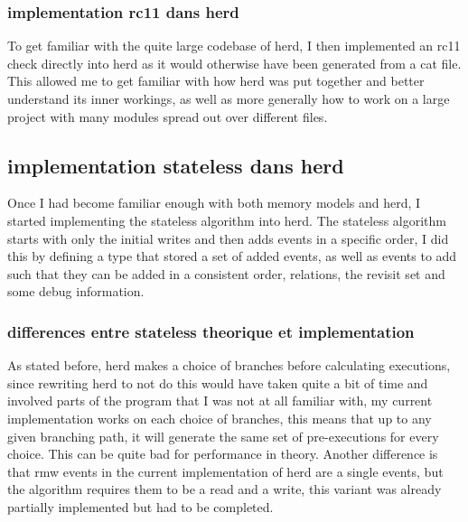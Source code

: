 \documentclass[a4,12pt]{article}
\begin{document}
\subsubsection{implementation rc11 dans herd}

To get familiar with the quite large codebase of herd, I then implemented an rc11 check directly into herd as it would otherwise have been generated from a cat file. This allowed me to get familiar with how herd was put together and better understand its inner workings, as well as more generally how to work on a large project with many modules spread out over different files.

\subsection{implementation stateless dans herd}

Once I had become familiar enough with both memory models and herd, I started implementing the stateless algorithm into herd. The stateless algorithm starts with only the initial writes and then adds events in a specific order, I did this by defining a type that stored a set of added events, as well as events to add such that they can be added in a consistent order, relations, the revisit set and some debug information.

\subsubsection{differences entre stateless theorique et implementation}

As stated before, herd makes a choice of branches before calculating executions, since rewriting herd to not do this would have taken quite a bit of time and involved parts of the program that I was not at all familiar with, my current implementation works on each choice of branches, this means that up to any given branching path, it will generate the same set of pre-executions for every choice. This can be quite bad for performance in theory. Another difference is that rmw events in the current implementation of herd are a single events, but the algorithm requires them to be a read and a write, this variant was already partially implemented but had to be completed.

\end{document}
